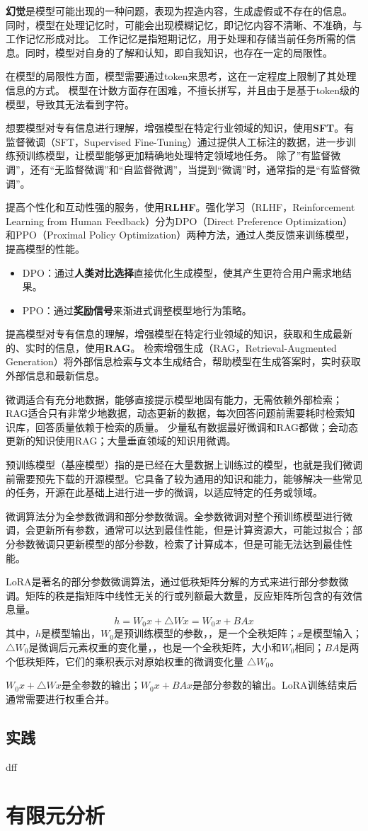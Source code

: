 \documentclass[12pt]{article}
\begin{document}
\textbf{幻觉}是模型可能出现的一种问题，表现为捏造内容，生成虚假或不存在的信息。
同时，模型在处理记忆时，可能会出现模糊记忆，即记忆内容不清晰、不准确，与工作记忆形成对比。
工作记忆是指短期记忆，用于处理和存储当前任务所需的信息。同时，模型对自身的了解和认知，即自我知识，也存在一定的局限性。

在模型的局限性方面，模型需要通过token来思考，这在一定程度上限制了其处理信息的方式。
模型在计数方面存在困难，不擅长拼写，并且由于是基于token级的模型，导致其无法看到字符。

想要模型对专有信息进行理解，增强模型在特定行业领域的知识，使用\textbf{SFT}。有监督微调（SFT，Supervised Fine-Tuning）通过提供人工标注的数据，进一步训练预训练模型，让模型能够更加精确地处理特定领域地任务。
除了”有监督微调”，还有“无监督微调”和“自监督微调”，当提到“微调”时，通常指的是“有监督微调”。


提高个性化和互动性强的服务，使用\textbf{RLHF}。强化学习（RLHF，Reinforcement Learning from Human Feedback）分为DPO（Direct Preference Optimization）和PPO（Proximal Policy Optimization）两种方法，通过人类反馈来训练模型，提高模型的性能。
\begin{itemize}
    \item DPO：通过\textbf{人类对比选择}直接优化生成模型，使其产生更符合用户需求地结果。
    \item PPO：通过\textbf{奖励信号}来渐进式调整模型地行为策略。
\end{itemize}

提高模型对专有信息的理解，增强模型在特定行业领域的知识，获取和生成最新的、实时的信息，使用\textbf{RAG}。
检索增强生成（RAG，Retrieval-Augmented Generation）将外部信息检索与文本生成结合，帮助模型在生成答案时，实时获取外部信息和最新信息。

微调适合有充分地数据，能够直接提示模型地固有能力，无需依赖外部检索；RAG适合只有非常少地数据，动态更新的数据，每次回答问题前需要耗时检索知识库，回答质量依赖于检索的质量。
少量私有数据最好微调和RAG都做；会动态更新的知识使用RAG；大量垂直领域的知识用微调。

预训练模型（基座模型）指的是已经在大量数据上训练过的模型，也就是我们微调前需要预先下载的开源模型。它具备了较为通用的知识和能力，能够解决一些常见的任务，开源在此基础上进行进一步的微调，以适应特定的任务或领域。

微调算法分为全参数微调和部分参数微调。全参数微调对整个预训练模型进行微调，会更新所有参数，通常可以达到最佳性能，但是计算资源大，可能过拟合；部分参数微调只更新模型的部分参数，检索了计算成本，但是可能无法达到最佳性能。

LoRA是著名的部分参数微调算法，通过低秩矩阵分解的方式来进行部分参数微调。矩阵的秩是指矩阵中线性无关的行或列额最大数量，反应矩阵所包含的有效信息量。
$$
h = W_0x + \triangle Wx = W_0x + BAx
$$
其中，$h$是模型输出，$W_0$是预训练模型的参数，，是一个全秩矩阵；$x$是模型输入；
$\triangle W_0$是微调后元素权重的变化量，，也是一个全秩矩阵，大小和$W_0$相同；$BA$是两个低秩矩阵，它们的乘积表示对原始权重的微调变化量
$\triangle W_0$。

$W_0x + \triangle Wx$是全参数的输出；$W_0x + BAx$是部分参数的输出。LoRA训练结束后通常需要进行权重合并。
\subsection{实践}


dff
\section{有限元分析}
\end{document}
